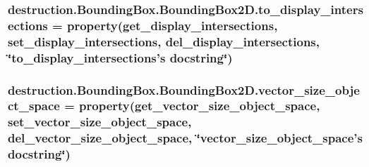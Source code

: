 \hypertarget{classdestruction_1_1_bounding_box_1_1_bounding_box2_d_a890e9c1d940163524bbf1ecf6f27fba1}{
\subsubsection[{to\-\_\-display\-\_\-intersections}]{\setlength{\rightskip}{0pt plus 5cm}destruction.\-Bounding\-Box.\-Bounding\-Box2\-D.\-to\-\_\-display\-\_\-intersections = property({\bf get\-\_\-display\-\_\-intersections}, {\bf set\-\_\-display\-\_\-intersections}, {\bf del\-\_\-display\-\_\-intersections}, \char`\"{}to\-\_\-display\-\_\-intersections's docstring\char`\"{})\hspace{0.3cm}{\ttfamily [static]}}}\label{classdestruction_1_1_bounding_box_1_1_bounding_box2_d_a890e9c1d940163524bbf1ecf6f27fba1}
\hypertarget{classdestruction_1_1_bounding_box_1_1_bounding_box2_d_a7ec9d93f6cc2bf90c8335c367102eca8}{
\subsubsection[{vector\-\_\-size\-\_\-object\-\_\-space}]{\setlength{\rightskip}{0pt plus 5cm}destruction.\-Bounding\-Box.\-Bounding\-Box2\-D.\-vector\-\_\-size\-\_\-object\-\_\-space = property({\bf get\-\_\-vector\-\_\-size\-\_\-object\-\_\-space}, {\bf set\-\_\-vector\-\_\-size\-\_\-object\-\_\-space}, {\bf del\-\_\-vector\-\_\-size\-\_\-object\-\_\-space}, \char`\"{}vector\-\_\-size\-\_\-object\-\_\-space's docstring\char`\"{})\hspace{0.3cm}{\ttfamily [static]}}}\label{classdestruction_1_1_bounding_box_1_1_bounding_box2_d_a7ec9d93f6cc2bf90c8335c367102eca8}
